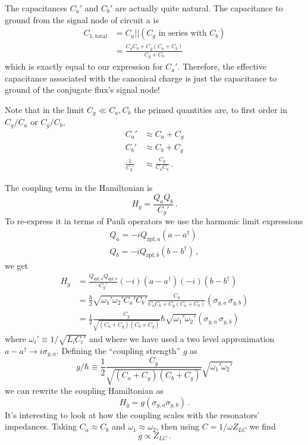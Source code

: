 The capacitances $C_a'$ and $C_b'$ are actually quite natural.
The capacitance to ground from the signal node of circuit a is
\begin{align*}
  C_{1, \textrm{total}}
  &= C_a || (C_g \textrm{ in series with } C_b) \\
  &= \frac{C_a C_b + C_g(C_a+C_b)}{C_g+C_b}
\end{align*}
which is exactly equal to our expression for $C_a'$.
Therefore, the effective capacitance associated with the canonical charge is just the capacitance to ground of the conjugate flux's signal node!

Note that in the limit $C_g \ll C_a, C_b$ the primed quantities are, to first order in $C_g / C_a$ or $C_g / C_b$,
\begin{align*}
  C_a' & \approx C_a + C_g \\
  C_b' & \approx C_b + C_g \\
  \frac{1}{C_g'} & \approx \frac{C_g}{C_a C_b} \, .
\end{align*}

The coupling term in the Hamiltonian is
\begin{equation}
  H_g = \frac{ Q_a Q_b} {C_g'} \, . \label{eq:sec:coupling:H_g}
\end{equation}
To re-express it in terms of Pauli operators we use the harmonic limit expressions
\begin{align}
  Q_a = -i Q_{\textrm{zpf}, a} (a - a^{\dagger}) \nonumber \\
  Q_b = -i Q_{\textrm{zpf}, b} (b - b^{\dagger}) \nonumber \, ,
\end{align}
we get
\begin{align*}
  H_g
  &= \frac{Q_{\textrm{zpf},a}Q_{\textrm{zpf},b}}{C_g'}
    (-i)(a - a^\dagger) (-i)(b - b^\dagger) \\
  &= \frac{\hbar}{2} \sqrt{\omega_1' \omega_2' C_a' C_b'}
    \frac{C_g}{C_a C_b + C_g(C_a + C_b)} (\sigma_{y,a} \, \sigma_{y,b}) \\
  &= \frac{1}{2}\frac{C_g}{\sqrt{(C_a + C_g) (C_b + C_g)}} \hbar
    \sqrt{\omega_1' \omega_2'} (\sigma_{y,a} \, \sigma_{y,b})
\end{align*}
where $\omega_i' \equiv 1 / \sqrt{L_i C_i'}$ and where we have used a two level approximation \mbox{$a - a^\dagger \rightarrow i \sigma_{y,a}$}.
Defining the ``coupling strength'' $g$ as
\begin{equation}
  g/\hbar \equiv \frac{1}{2} \frac{C_g}{\sqrt{(C_a + C_g) (C_b + C_g)}} \sqrt{\omega_1' \omega_2'}
\end{equation}
we can rewrite the coupling Hamiltonian as
\begin{equation}
  H_g = g \left( \sigma_{y,a} \sigma_{y,b} \right) \, .
\end{equation}
It's interesting to look at how the coupling scales with the resonators' impedances.
Taking $C_a \approx C_b$ and $\omega_1 \approx \omega_2$, then using $C = 1 / \omega Z_{LC}$ we find
\begin{equation}
  g \propto Z_{LC} \, .
\end{equation}

